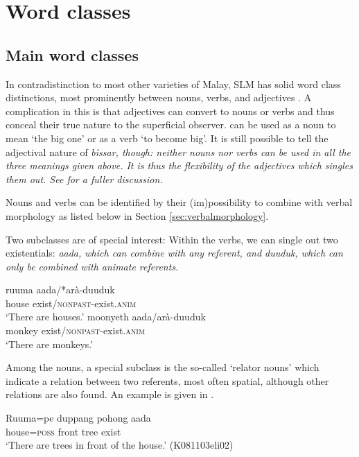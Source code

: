 \section{Word classes}

\subsection{Main word classes}
In contradistinction to most other varieties of Malay, SLM has solid word class distinctions, most prominently between nouns, verbs, and adjectives \citep{Nordhofffcjoat}. A complication in this is that adjectives can convert to nouns or verbs and thus conceal their true nature to the superficial observer.  can be used as a noun to mean `the big one' or as a verb `to become big'. It is still possible to tell the adjectival nature of \em bìssar\em, though: neither nouns nor verbs can be used in all the three meanings given above. It is thus the flexibility of the adjectives which singles them out. See \citet{Nordhofffcjoat} for a fuller discussion.

Nouns and verbs can be identified by their (im)possibility to combine with verbal morphology as listed below in Section \ref{sec:verbalmorphology}.

Two subclasses are of special interest: Within the verbs, we can single out two existentials: \em aada\em, which can combine with any referent, and \em duuduk\em, which can only be combined with animate referents. 

\ea 
    \ea
	\gll ruuma aada/*arà-duuduk\\
	house exist/\textsc{nonpast}-exist.\textsc{anim}\\
	`There are houses.'
    \ex
	\gll moonyeth aada/arà-duuduk\\
	monkey exist/\textsc{nonpast}-exist.\textsc{anim}\\
	`There are monkeys.'

    \z
\z

Among the nouns, a special subclass is the so-called `relator nouns' which indicate a relation between two referents, most often spatial, although other relations are also found. An example is given in .

\ea\label{ex:relatornouns}
\gll Ruuma=pe duppang pohong aada  \\
    house=\textsc{poss} front tree exist   \\
    `There are trees in front of the house.' (K081103eli02)
\z

